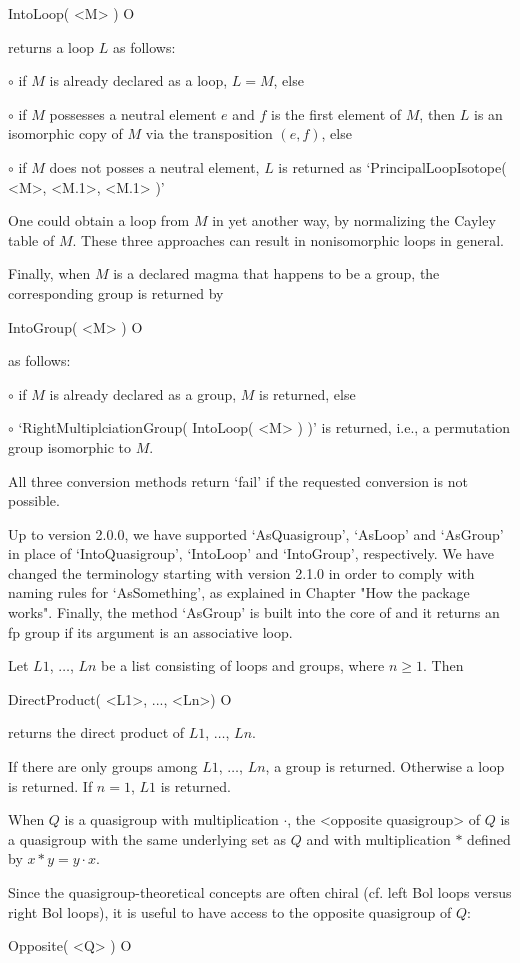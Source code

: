 \>IntoLoop( <M> ) O

returns a loop $L$ as follows:
\beginlist%
\item{$\circ$} if $M$ is already declared as a loop, $L=M$, else
\item{$\circ$}
    if $M$ possesses a neutral element $e$ and $f$ is the first element of $M$,
    then $L$ is an isomorphic copy of $M$ via the transposition $(e,f)$, else
\item{$\circ$}
    if $M$ does not posses a neutral element, $L$ is returned as
    `PrincipalLoopIsotope( <M>, <M.1>, <M.1> )'
\endlist

One could obtain a loop from $M$ in yet another way, by normalizing the Cayley
table of $M$. These three approaches can result in nonisomorphic loops in
general.

Finally, when $M$ is a declared magma that happens to be a group, the
corresponding group is returned by

\>IntoGroup( <M> ) O

as follows:
\beginlist%
\item{$\circ$} if $M$ is already declared as a group, $M$ is returned, else
\item{$\circ$} `RightMultiplciationGroup( IntoLoop( <M> ) )' is returned, i.e.,
    a permutation group isomorphic to $M$.
\endlist

All three conversion methods return `fail' if the requested conversion is not
possible.

Up to version 2.0.0, we have supported `AsQuasigroup', `AsLoop' and `AsGroup'
in place of `IntoQuasigroup', `IntoLoop' and `IntoGroup', respectively. We have
changed the terminology starting with version 2.1.0 in order to comply with
{\GAP} naming rules for `AsSomething', as explained in Chapter "How the package
works". Finally, the method `AsGroup' is built into the core of {\GAP} and it
returns an fp group if its argument is an associative loop.


\noindent Let $L1$, $\dots$, $Ln$ be a list consisting of loops and groups,
where $n\ge 1$. Then

\>DirectProduct( <L1>, ..., <Ln>) O

returns the direct product of $L1$, $\dots$, $Ln$.

If there are only groups among $L1$, $\dots$, $Ln$, a group is returned.
Otherwise a loop is returned. If $n=1$, $L1$ is returned.


When $Q$ is a quasigroup with multiplication $\cdot$, the <opposite
quasigroup> of $Q$ is a
quasigroup with the same underlying set as $Q$ and with multiplication $*$
defined by $x*y=y\cdot x$.

Since the quasigroup-theoretical concepts are often chiral (cf. left Bol loops
versus right Bol loops), it is useful to have access to the opposite quasigroup
of $Q$:

\>Opposite( <Q> ) O

